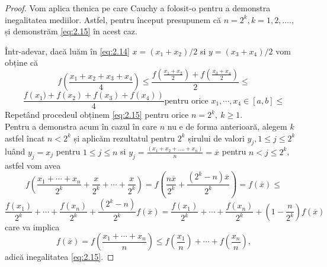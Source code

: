 \documentclass[a4paper,12pt,oneside]{report}
\begin{document}
\begin{proof}
Vom aplica thenica pe care Cauchy a folosit-o pentru a demonstra inegalitatea mediilor. Astfel, pentru început presupunem că \(n = 2^{k}, k=1,2,….,\) și demonstrăm \ref{eq:2.15} în acest caz.

Într-adevar, dacă luăm în \ref{eq:2.14} $x=(x_1+x_2)/2$ si $y=(x_3+x_4)/2$ vom obține că
\begin{equation*}
  f\left ( \frac{x_1 + x_2+x_3+x_4}{4} \right ) \leq \frac{f\left ( \frac{x_1 + x_2}{2} \right) + f\left(\frac{x_3 + x_4}{2} \right )}{2} \leq
\end{equation*}
\begin{equation*}
   \frac{f\left (x_1) + f\left (x_2 \right )+f\left (x_3 \right )+f\left (x_4 \right ) \right)}{4} \text{pentru orice } x_1, \cdots, x_4 \in \left [ a, b \right ]\leq
\end{equation*}
Repetând procedeul obținem \ref{eq:2.15} pentru orice $n=2^k,~k\geq 1.$\\
 Pentru a demonstra acum în cazul în care $n$ nu e de forma anterioară, alegem  \(k\) astfel încat \(n< 2^{k}\) și aplicăm rezultatul pentru \(2^{k}\) șirului de valori \(y_{j} , 1\leq j\leq 2^{k}\) luând \(y_{j} = x_{j}\) pentru \(1\leq j\leq n \) si \(y_{j} = \frac{\left ( x_{1} + x_{2} + ....+ x_{n} \right )}{n}=\overline{x}\) pentru \(n< j\leq 2^{k}\), astfel vom avea
 \[
   f\left ( \frac{x_1 + \cdots+x_n}{2^k}+\frac{x}{2^k}+\cdots+\frac{x}{2^k} \right )=f\left( \frac{n \overline{x}}{2^k}+\frac{(2^k-n) \overline{x}}{2^k}\right)=f(\overline{x}) \leq
 \]
 \[
\frac{ f(x_1)}{2^k}+\cdots+\frac{ f(x_n)}{2^k}+\frac{(2^k-n)}{2^k}f(\overline{x})=\frac{ f(x_1)}{2^k}+\cdots+\frac{ f(x_n)}{2^k}+ (1-\frac{n}{2^k})f(\overline{x})
 \]
 care va implica
 \[
 f(\overline{x})=  f\left ( \frac{x_1 + \cdots+x_n}{n} \right )\leq f\left ( \frac{x_1}{n} \right )+\cdots+f\left ( \frac{x_n}{n} \right ),
 \]
 adică inegalitatea \ref{eq:2.15}.
\end{proof}
\end{document}
